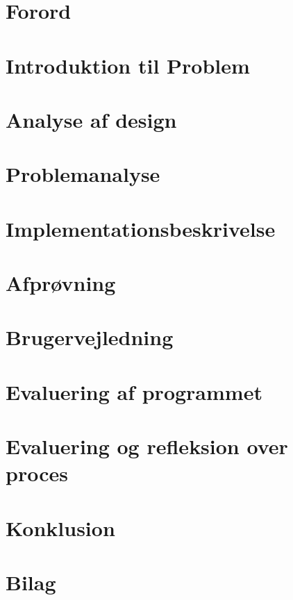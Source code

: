 


	\chapter{Forord}
	
	\newpage

	\tableofcontents* %
	\newpage

	\chapter{Introduktion til Problem}
	

	\chapter{Analyse af design}
	

	\chapter{Problemanalyse}
	

	\chapter{Implementationsbeskrivelse}
	

	\chapter{Afprøvning}
	

	\chapter{Brugervejledning}
	

	\chapter{Evaluering af programmet}
	

	\chapter{Evaluering og refleksion over proces}
	

	\chapter{Konklusion}
	

	\chapter{Bilag}
	


